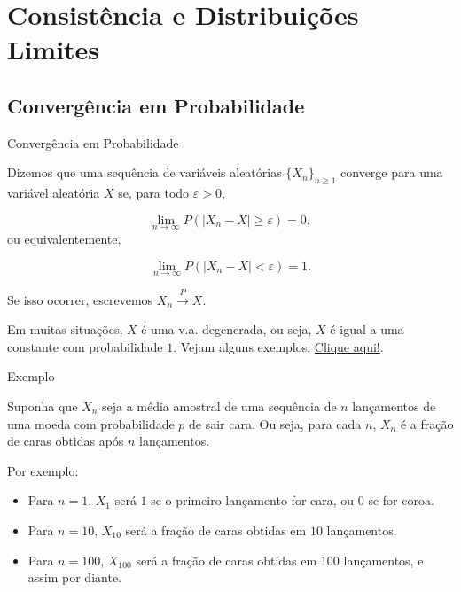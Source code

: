 \documentclass[12pt]{beamer}
\begin{document}
\section{Consistência e Distribuições Limites}
\subsection{Convergência em Probabilidade}
\begin{frame}{Convergência em Probabilidade}
\begin{definicao}
\justifying
Dizemos que uma sequência de variáveis aleatórias $\{X_{n}\}_{n\geq 1}$  converge para uma variável aleatória $X$ se, para todo $\varepsilon > 0,$

\begin{equation}
\lim_{n\to\infty}P(|X_{n} - X| \geq \varepsilon) = 0,
\end{equation}
\pause
ou equivalentemente,

\begin{equation}
\lim_{n\to\infty}P(|X_{n} - X| < \varepsilon) = 1.
\end{equation}

Se isso ocorrer, escrevemos $X_{n} \xrightarrow{P} X$.    
\end{definicao}\pause
\begin{block}{}
    Em muitas situações, $X$ é uma v.a. degenerada, ou seja, $X$ é igual a uma constante com probabilidade $1.$ Vejam alguns exemplos, \href{https://est711.shinyapps.io/ConvergenciaProbabilidade/}{Clique aqui!}.
\end{block}
\end{frame}

\begin{frame}{Exemplo}
	\begin{block}{}
Suponha que \( X_n \) seja a média amostral de uma sequência de \( n \) lançamentos de uma moeda com probabilidade \( p \) de sair cara. Ou seja, para cada \( n \), \( X_n \) é a fração de caras obtidas após \( n \) lançamentos.

Por exemplo:
\begin{itemize}
	\item Para \( n = 1 \), \( X_1 \) será \( 1 \) se o primeiro lançamento for cara, ou \( 0 \) se for coroa.
	\item Para \( n = 10 \), \( X_{10} \) será a fração de caras obtidas em \( 10 \) lançamentos.
	\item Para \( n = 100 \), \( X_{100} \) será a fração de caras obtidas em \( 100 \) lançamentos, e assim por diante.
\end{itemize}
	\end{block}
\end{frame}
\end{document}
